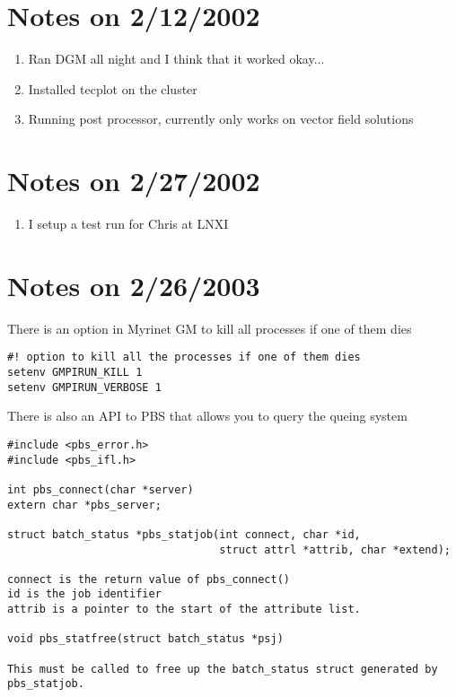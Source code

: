 \documentclass[10pt]{article}
\begin{document}
\section*{\normalsize Notes on 2/12/2002}
\begin{enumerate}
\item Ran DGM all night and I think that it worked okay...
\item Installed tecplot on the cluster
\item Running post processor, currently only works on vector field solutions
\end{enumerate}

\section*{\normalsize Notes on 2/27/2002}
\begin{enumerate}
\item I setup a test run for Chris at LNXI
\end{enumerate}


\section*{\normalsize Notes on 2/26/2003}
There is an option in Myrinet GM to kill all processes if one of them dies
\begin{verbatim}
#! option to kill all the processes if one of them dies
setenv GMPIRUN_KILL 1   
setenv GMPIRUN_VERBOSE 1
\end{verbatim}
There is also an API to PBS that allows you to query the queing system
\begin{verbatim}
#include <pbs_error.h>
#include <pbs_ifl.h>

int pbs_connect(char *server)
extern char *pbs_server;

struct batch_status *pbs_statjob(int connect, char *id, 
                                 struct attrl *attrib, char *extend);

connect is the return value of pbs_connect()
id is the job identifier
attrib is a pointer to the start of the attribute list.

void pbs_statfree(struct batch_status *psj)

This must be called to free up the batch_status struct generated by 
pbs_statjob.
\end{verbatim}
\end{document}
